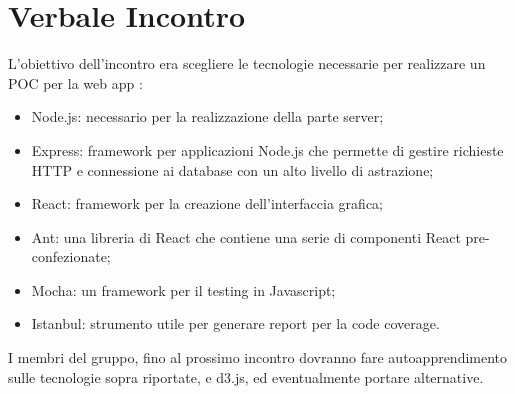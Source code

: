 \section{Verbale Incontro}
    L'obiettivo dell'incontro era scegliere le tecnologie necessarie per realizzare un POC per la web app \hd :
        \begin{itemize}
            \item Node.js: necessario per la realizzazione della parte server;
            \item Express: framework per applicazioni Node.js che permette di gestire richieste HTTP e connessione ai database con un alto livello di astrazione;
            \item React: framework per la creazione dell'interfaccia grafica;
            \item Ant: una libreria di React che contiene una serie di componenti React pre-confezionate;
            \item Mocha: un framework per il testing in Javascript;
            \item Istanbul: strumento utile per generare report per la code coverage.
        \end{itemize}

    I membri del gruppo, fino al prossimo incontro dovranno fare autoapprendimento sulle tecnologie sopra riportate, e d3.js, ed eventualmente portare alternative.